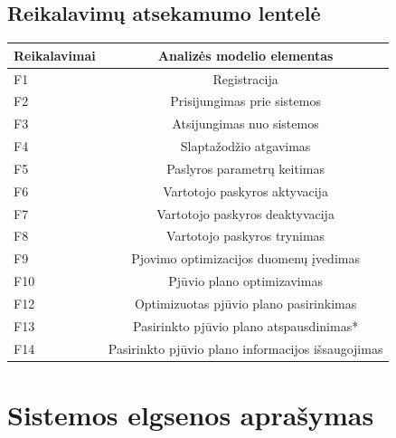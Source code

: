 \documentclass[a4paper,12pt]{article}
\begin{document}
\subsection{Reikalavimų atsekamumo lentelė}
\begin{frame}
\centering
\hspace{-2.5cm}
\label{my-label}
\begin{tabular}{|l|c|}
\hline
\textbf{Reikalavimai}						& \textbf{Analizės modelio elementas} 		\\ \hline

F1 	& Registracija \\ \hline
F2 	& Prisijungimas prie sistemos \\ \hline
F3 	& Atsijungimas nuo sistemos \\ \hline
F4 	& Slaptažodžio atgavimas \\ \hline
F5 	& Paslyros parametrų keitimas \\ \hline
F6 	& Vartotojo paskyros aktyvacija \\ \hline
F7 	& Vartotojo paskyros deaktyvacija \\ \hline
F8 	& Vartotojo paskyros trynimas \\ \hline
F9 	& Pjovimo optimizacijos duomenų įvedimas \\ \hline
F10	& Pjūvio plano optimizavimas \\ \hline
F12	& Optimizuotas pjūvio plano pasirinkimas \\ \hline
F13	& Pasirinkto pjūvio plano atspausdinimas* \\ \hline
F14	& Pasirinkto pjūvio plano informacijos išsaugojimas \\ \hline
\end{tabular}
\end{frame}


\section{Sistemos elgsenos aprašymas}
\vspace{1cm}
\end{document}
